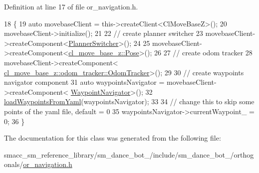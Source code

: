 Definition at line 17 of file or\+\_\+navigation.\+h.


\begin{DoxyCode}
18     \{
19         \textcolor{keyword}{auto} movebaseClient = this->createClient<ClMoveBaseZ>();
20         movebaseClient->initialize();
21 
22         \textcolor{comment}{// create planner switcher}
23         movebaseClient->createComponent<\hyperlink{classcl__move__base__z_1_1PlannerSwitcher}{PlannerSwitcher}>();
24 
25         movebaseClient->createComponent<\hyperlink{classcl__move__base__z_1_1Pose}{cl\_move\_base\_z::Pose}>();
26 
27         \textcolor{comment}{// create odom tracker}
28         movebaseClient->createComponent<
      \hyperlink{classcl__move__base__z_1_1odom__tracker_1_1OdomTracker}{cl\_move\_base\_z::odom\_tracker::OdomTracker}>();
29 
30         \textcolor{comment}{// create waypoints navigator component}
31         \textcolor{keyword}{auto} waypointsNavigator = movebaseClient->createComponent<
      \hyperlink{classcl__move__base__z_1_1WaypointNavigator}{WaypointNavigator}>();
32         \hyperlink{classsm__dance__bot__2_1_1OrNavigation_a663fc206de1964058c851f521279ca34}{loadWaypointsFromYaml}(waypointsNavigator);
33 
34         \textcolor{comment}{// change this to skip some points of the yaml file, default = 0}
35         waypointsNavigator->currentWaypoint\_ = 0;
36     \}
\end{DoxyCode}


The documentation for this class was generated from the following file\+:\begin{DoxyCompactItemize}
\item 
smacc\+\_\+sm\+\_\+reference\+\_\+library/sm\+\_\+dance\+\_\+bot\+\_/include/sm\+\_\+dance\+\_\+bot\+\_/orthogonals/\hyperlink{sm__dance__bot__2_2include_2sm__dance__bot__2_2orthogonals_2or__navigation_8h}{or\+\_\+navigation.\+h}\end{DoxyCompactItemize}
